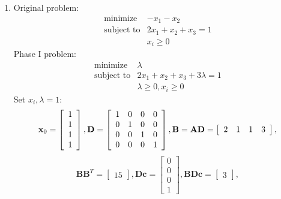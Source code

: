 \documentclass{article}
\begin{document}
\begin{enumerate}
	\item Original problem:
		\begin{displaymath}
			\begin{array}{ll}
			\textrm{minimize} & -x_1 - x_2 \\
			\textrm{subject to} & 2x_1 + x_2 + x_3 = 1 \\
			& x_i \ge 0
			\end{array}
		\end{displaymath}
		Phase I problem:
		\begin{displaymath}
			\begin{array}{ll}
			\textrm{minimize} & \lambda \\
			\textrm{subject to} & 2x_1 + x_2 + x_3 + 3 \lambda = 1 \\
			& \lambda \ge 0, x_i \ge 0
			\end{array}
		\end{displaymath}
		Set $x_i, \lambda = 1$:
			\begin{displaymath}
				\mathbf{x}_0 = \left[ \begin{array}{c} 1 \\ 1 \\ 1 \\ 1 \end{array} \right],
				\mathbf{D} = \left[ \begin{array}{c c c c} 1 & 0 & 0 & 0 \\ 0 & 1 & 0 & 0 \\ 0 & 0 & 1 & 0 \\ 0 & 0 & 0 & 1 \end{array} \right],
				\mathbf{B} = \mathbf{AD} = \left[ \begin{array}{c c c c} 2 & 1 & 1 & 3 \end{array} \right],
			\end{displaymath}
			\begin{displaymath}
				\mathbf{BB}^T = \left[ \begin{array}{c} 15 \end{array} \right], \mathbf{Dc} = \left[ \begin{array}{c} 0 \\ 0 \\ 0 \\ 1 \end{array} \right], \mathbf{BDc} = \left[ \begin{array}{c} 3 \end{array} \right],
			\end{displaymath}
			\begin{displaymath}

\end{displaymath}
\end{enumerate}
\end{document}
